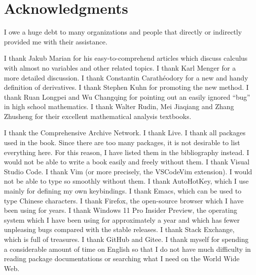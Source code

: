 \chapter{Acknowledgments}

I
owe a huge debt
to many organizations and people
that directly or indirectly provided me
with their assistance.

I thank Jakub Marian for his easy-to-comprehend articles
which discuss calculus with almost no variables
and other related topics.%
\cite{%
    Marian:FunctionsWithoutVariables,%
    Marian:DifferentiationWithoutVariables,%
    Marian:IndefiniteIntegrationWithoutVariables,%
    Marian:DefiniteIntegrationWithoutVariables,%
    Marian:CalculusOfFiniteDifferencesWithoutVariables,%
    Marian:QuantificationWithoutVariables,%
    Marian:SecondSubstitutionMethodForIntegrationWithoutVariables%
}
I thank Karl Menger\cite{%
    Menger:AreVariablesNecessaryInCalculus}
for a more detailed discussion.
I thank Constantin Carath\'eodory
for a new and handy definition of derivatives.
I thank Stephen Kuhn\cite{Kuhn:DerivativeALaCaratheodory}
for promoting the new method.
I thank Ruan Long\-pei\cite{Ruan:OpinionsOnSolidGeometryUsingSets}
and Wu Chang\-qing\cite{Wu:AccuracyOfSolidGeometryUsingSets}
for pointing out an easily ignored ``bug''
in high school mathematics.
I thank Walter Rudin\cite{Rudin:MathematicalAnalysis},
Mei Jia\-qiang\cite{Mei:Analysis}
and Zhang Zhu\-sheng\cite{Zhang:Analysis}
for their excellent mathematical analysis textbooks.

I
thank the Comprehensive  Archive Network.
I thank  Live.
I thank all packages used in the book.
Since there are too many packages,
it is not desirable to list everything here.
For this reason,
I have listed them in the bibliography instead.
I would not be able to write a book easily and freely
without them.
I thank Visual Studio Code.
I thank Vim (or more precisely, the VS\-Code\-Vim extension).
I would not be able to type so smoothly without them.
I thank Auto\-Hot\-Key,
which I use mainly for defining my own keybindings.
I thank Emacs, which can be used to type Chinese characters.
I thank Firefox, the open-source browser
which I have been using for years.
I thank Windows 11 Pro Insider Preview,
the operating system which I have been using
for approximately a year
and which has fewer unpleasing bugs
compared with the stable releases.
I thank  Stack Exchange,
which is full of  treasures.
I thank Git\-Hub and Gitee.
I thank myself for spending
a considerable amount of time on English
so that I do not have much difficulty
in reading package documentations
or searching what I need on the World Wide Web.

